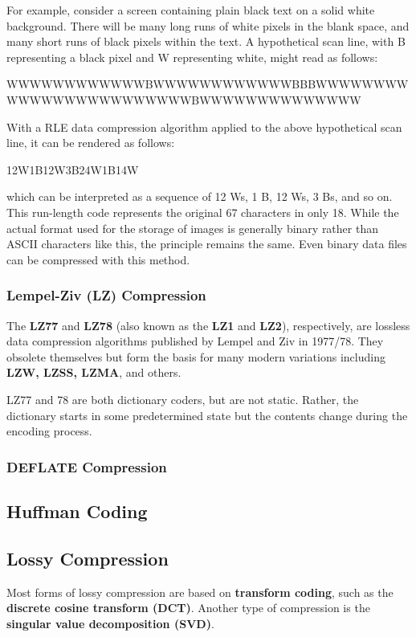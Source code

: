 \documentclass[a4paper, 12pt]{report}
\theoremstyle{remark}
\theoremstyle{definition}
\begin{document}
For example, consider a screen containing plain black text on a solid white background. There will be many long runs of white pixels in the blank space, and many short runs of black pixels within the text. A hypothetical scan line, with B representing a black pixel and W representing white, might read as follows: 
\begin{python}
WWWWWWWWWWWWBWWWWWWWWWWWWBBBWWWWWWWWWWWWWWWWWWWWWWWWBWWWWWWWWWWWWWW
\end{python}
With a RLE data compression algorithm applied to the above hypothetical scan line, it can be rendered as follows: 
\begin{python}
12W1B12W3B24W1B14W
\end{python}
which can be interpreted as a sequence of 12 Ws, 1 B, 12 Ws, 3 Bs, and so on. This run-length code represents the original 67 characters in only 18. While the actual format used for the storage of images is generally binary rather than ASCII characters like this, the principle remains the same. Even binary data files can be compressed with this method. 

\subsubsection{Lempel-Ziv (LZ) Compression}
The \textbf{LZ77} and \textbf{LZ78} (also known as the \textbf{LZ1} and \textbf{LZ2}), respectively, are lossless data compression algorithms published by Lempel and Ziv in 1977/78. They obsolete themselves but form the basis for many modern variations including \textbf{LZW, LZSS, LZMA}, and others. 

LZ77 and 78 are both dictionary coders, but are not static. Rather, the dictionary starts in some predetermined state but the contents change during the encoding process. 

\subsubsection{DEFLATE Compression}

\subsection{Huffman Coding}


\subsection{Lossy Compression}
Most forms of lossy compression are based on \textbf{transform coding}, such as the \textbf{discrete cosine transform (DCT)}. Another type of compression is the \textbf{singular value decomposition (SVD)}. 
\end{document}
